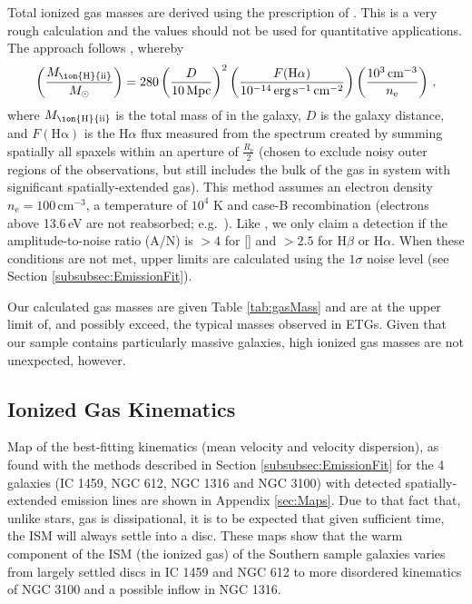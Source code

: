 \documentclass[a4paper,fleqn,usenatbib]{mnras}
\begin{document}
	Total ionized gas masses are derived using the prescription of \citet{Sarzi2005}. This is a very rough calculation and the values should not be used for quantitative applications. The approach follows \citet{Kim1989}, whereby
	\begin{equation}
		\left(\frac{M_\text{\ion{H}{ii}}}{M_\odot}\right) = 280 \left(\frac{D}{10\, \mathrm{Mpc}}\right)^2 \left(\frac{F(\mathrm{H\alpha})}{10^{-14} \, \mathrm{erg \, s^{-1} \, cm^{-2}}}\right) \left(\frac{10^3 \, \mathrm{cm^{-3}}}{n_\mathrm{e}}\right) \, ,
	\end{equation}
	where $M_\text{\ion{H}{ii}}$ is the total mass of  in the galaxy, $D$ is the galaxy distance, and $F(\mathrm{H\alpha})$ is the H$\alpha$ flux measured from the spectrum created by summing spatially all spaxels within an aperture of $\frac{R_\mathrm{e}}{2}$ (chosen to exclude noisy outer regions of the observations, but still includes the bulk of the gas in system with significant spatially-extended gas). This method assumes an electron density $n_\mathrm{e} = 100 \, \mathrm{cm^{-3}}$, a temperature of $10^4$ K and case-B recombination (electrons above 13.6\,eV are not reabsorbed; e.g.\ \citealt[p.\,74]{Osterbrock1974}). Like \citet{Sarzi2005}, we only claim a detection if the amplitude-to-noise ratio (A/N) is $>4$ for [] and $>2.5$ for H$\beta$ or H$\alpha$. When these conditions are not met, upper limits are calculated using the $1\sigma$ noise level (see Section \ref{subsubsec:EmissionFit}).

	Our calculated gas masses are given Table \ref{tab:gasMass} and are at the upper limit of, and possibly exceed, the typical masses observed in ETGs. Given that our sample contains particularly massive galaxies, high ionized gas masses are not unexpected, however.

	\subsection{Ionized Gas Kinematics}
		\label{subsec:GasKin}
		Map of the best-fitting kinematics (mean velocity and velocity dispersion), as found with the methods described in Section \ref{subsubsec:EmissionFit} for the 4 galaxies (IC 1459, NGC 612, NGC 1316 and NGC 3100) with detected spatially-extended emission lines are shown in Appendix \ref{sec:Maps}. Due to that fact that, unlike stars, gas is dissipational, it is to be expected that given sufficient time, the ISM will always settle into a disc. These maps show that the warm component of the ISM (the ionized gas) of the Southern sample galaxies varies from largely settled discs in IC 1459 and NGC 612 to more disordered kinematics of NGC 3100 and a possible inflow in NGC 1316.
\end{document}
